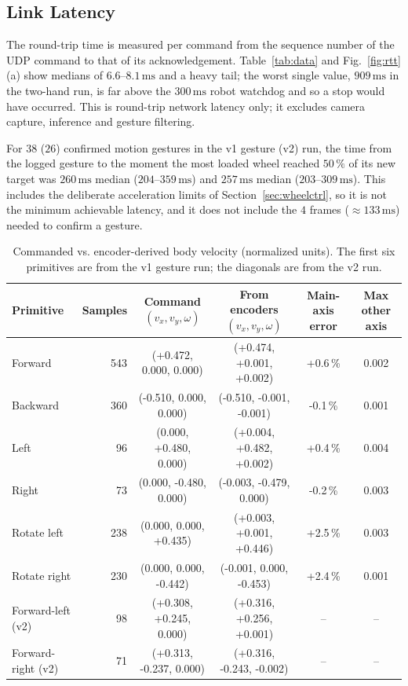\documentclass[5p,twocolumn]{elsarticle}
\begin{document}
\subsection{Link Latency}\label{sec:link}
The round-trip time is measured per command from the sequence number of the UDP command to that of its acknowledgement. Table~\ref{tab:data} and Fig.~\ref{fig:rtt}(a) show medians of $6.6$--$8.1\,\mathrm{ms}$ and a heavy tail; the worst single value, $909\,\mathrm{ms}$ in the two-hand run, is far above the $300\,\mathrm{ms}$ robot watchdog and so a stop would have occurred. This is round-trip network latency only; it excludes camera capture, inference and gesture filtering.

For $38$ ($26$) confirmed motion gestures in the v1 gesture (v2) run, the time from the logged gesture to the moment the most loaded wheel reached $50\,\%$ of its new target was $260\,\mathrm{ms}$ median ($204$--$359\,\mathrm{ms}$) and $257\,\mathrm{ms}$ median ($203$--$309\,\mathrm{ms}$). This includes the deliberate acceleration limits of Section~\ref{sec:wheelctrl}, so it is not the minimum achievable latency, and it does not include the $4$ frames ($\approx133\,\mathrm{ms}$) needed to confirm a gesture.

\begin{table}[!t]
\caption{Commanded vs. encoder-derived body velocity (normalized units). The first six primitives are from the v1 gesture run; the diagonals are from the v2 run.}
\label{tab:odo}
\centering
\footnotesize
\setlength{\tabcolsep}{3pt}
\begin{tabular}{lrcccc}
\toprule
Primitive & Samples & Command $(v_x,v_y,\omega)$ & From encoders $(v_x,v_y,\omega)$ & Main-axis error & Max other axis \\
\midrule
Forward        & 543 & (+0.472, 0.000, 0.000) & (+0.474, +0.001, +0.002) & +0.6\,\% & 0.002 \\
Backward       & 360 & (-0.510, 0.000, 0.000) & (-0.510, -0.001, -0.001) & -0.1\,\% & 0.001 \\
Left           &  96 & (0.000, +0.480, 0.000) & (+0.004, +0.482, +0.002) & +0.4\,\% & 0.004 \\
Right          &  73 & (0.000, -0.480, 0.000) & (-0.003, -0.479, 0.000) & -0.2\,\% & 0.003 \\
Rotate left    & 238 & (0.000, 0.000, +0.435) & (+0.003, +0.001, +0.446) & +2.5\,\% & 0.003 \\
Rotate right   & 230 & (0.000, 0.000, -0.442) & (-0.001, 0.000, -0.453)  & +2.4\,\% & 0.001 \\
Forward-left (v2)  &  98 & (+0.308, +0.245, 0.000) & (+0.316, +0.256, +0.001) & -- & -- \\
Forward-right (v2) &  71 & (+0.313, -0.237, 0.000) & (+0.316, -0.243, -0.002) & -- & -- \\
\bottomrule
\end{tabular}
\end{table}
\end{document}
